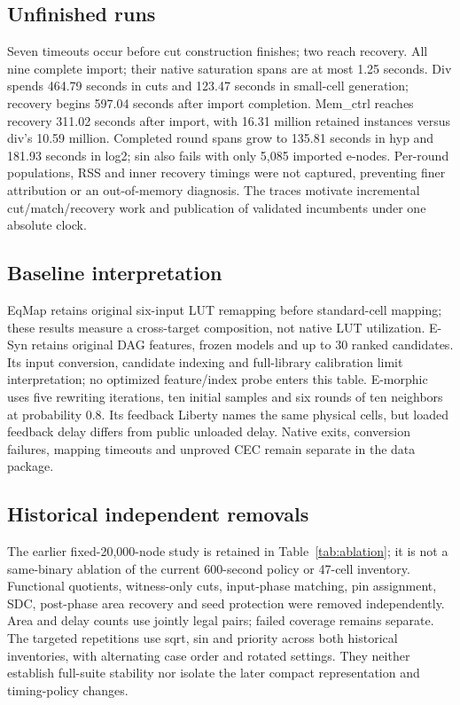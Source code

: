\documentclass[conference]{IEEEtran}
\begin{document}
\subsection{Unfinished runs}
Seven timeouts occur before cut construction finishes; two reach recovery.
All nine complete import; their native saturation spans are at most 1.25 seconds.
Div spends 464.79 seconds in cuts and 123.47 seconds in small-cell generation; recovery begins 597.04 seconds after import completion.
Mem\_ctrl reaches recovery 311.02 seconds after import, with 16.31 million retained instances versus div's 10.59 million.
Completed round spans grow to 135.81 seconds in hyp and 181.93 seconds in log2; sin also fails with only 5,085 imported e-nodes.
Per-round populations, RSS and inner recovery timings were not captured, preventing finer attribution or an out-of-memory diagnosis.
The traces motivate incremental cut/match/recovery work and publication of validated incumbents under one absolute clock.

\subsection{Baseline interpretation}
EqMap retains original six-input LUT remapping before standard-cell mapping; these results measure a cross-target composition, not native LUT utilization.
E-Syn retains original DAG features, frozen models and up to 30 ranked candidates. Its input conversion, candidate indexing and full-library calibration limit interpretation; no optimized feature/index probe enters this table.
E-morphic uses five rewriting iterations, ten initial samples and six rounds of ten neighbors at probability 0.8. Its feedback Liberty names the same physical cells, but loaded feedback delay differs from public unloaded delay.
Native exits, conversion failures, mapping timeouts and unproved CEC remain separate in the data package.

\subsection{Historical independent removals}
The earlier fixed-20,000-node study is retained in Table~\ref{tab:ablation}; it is not a same-binary ablation of the current 600-second policy or 47-cell inventory.
Functional quotients, witness-only cuts, input-phase matching, pin assignment, SDC, post-phase area recovery and seed protection were removed independently.
Area and delay counts use jointly legal pairs; failed coverage remains separate. The targeted repetitions use sqrt, sin and priority across both historical inventories, with alternating case order and rotated settings.
They neither establish full-suite stability nor isolate the later compact representation and timing-policy changes.
\end{document}
